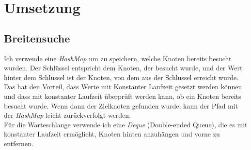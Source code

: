 \documentclass[a4paper,10pt,ngerman]{scrartcl}
\begin{document}
    \section{Umsetzung}

    \subsection{Breitensuche}
    Ich verwende eine \textit{HashMap} um zu speichern, welche Knoten bereits besucht wurden. 
    Der Schlüssel entspricht dem Knoten, der besucht wurde, und der Wert hinter dem Schlüssel ist der Knoten, von dem aus der Schlüssel erreicht wurde. 
    Das hat den Vorteil, dass Werte mit Konstanter Laufzeit gesetzt werden können und dass mit konstanter Laufzeit überprüft werden kann, ob ein Knoten bereits besucht wurde.
    Wenn dann der Zielknoten gefunden wurde, kann der Pfad mit der \textit{HashMap} leicht zurückverfolgt werden. \\
    Für die Warteschlange verwende ich eine \textit{Deque} (Double-ended Queue), die es mit konstanter Laufzeit ermöglicht, Knoten hinten anzuhängen und vorne zu entfernen.
\end{document}
